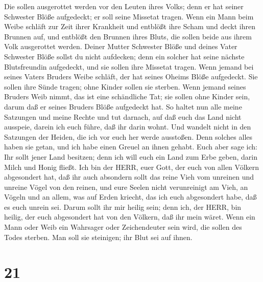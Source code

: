 Die sollen ausgerottet werden vor den Leuten ihres Volks; denn er hat
seiner Schwester Blöße aufgedeckt; er soll seine Missetat tragen.
 Wenn ein Mann beim Weibe schläft zur Zeit ihrer Krankheit
und entblößt ihre Scham und deckt ihren Brunnen auf, und entblößt den
Brunnen ihres Bluts, die sollen beide aus ihrem Volk ausgerottet werden.
 Deiner Mutter Schwester Blöße und deines Vater Schwester
Blöße sollst du nicht aufdecken; denn ein solcher hat seine nächste
Blutsfreundin aufgedeckt, und sie sollen ihre Missetat tragen.
 Wenn jemand bei seines Vaters Bruders Weibe schläft, der
hat seines Oheims Blöße aufgedeckt. Sie sollen ihre Sünde tragen; ohne
Kinder sollen sie sterben.  Wenn jemand seines Bruders Weib
nimmt, das ist eine schändliche Tat; sie sollen ohne Kinder sein, darum
daß er seines Bruders Blöße aufgedeckt hat.  So haltet nun
alle meine Satzungen und meine Rechte und tut darnach, auf daß euch das
Land nicht ausspeie, darein ich euch führe, daß ihr darin wohnt.
 Und wandelt nicht in den Satzungen der Heiden, die ich vor
euch her werde ausstoßen. Denn solches alles haben sie getan, und ich
habe einen Greuel an ihnen gehabt.  Euch aber sage ich: Ihr
sollt jener Land besitzen; denn ich will euch ein Land zum Erbe geben,
darin Milch und Honig fließt. Ich bin der HERR, euer Gott, der euch von
allen Völkern abgesondert hat,  daß ihr auch absondern
sollt das reine Vieh vom unreinen und unreine Vögel von den reinen, und
eure Seelen nicht verunreinigt am Vieh, an Vögeln und an allem, was auf
Erden kriecht, das ich euch abgesondert habe, daß es euch unrein sei.
 Darum sollt ihr mir heilig sein; denn ich, der HERR, bin
heilig, der euch abgesondert hat von den Völkern, daß ihr mein wäret.
 Wenn ein Mann oder Weib ein Wahrsager oder Zeichendeuter
sein wird, die sollen des Todes sterben. Man soll sie steinigen; ihr
Blut sei auf ihnen.

\hypertarget{section-20}{%
\section{21}\label{section-20}}

